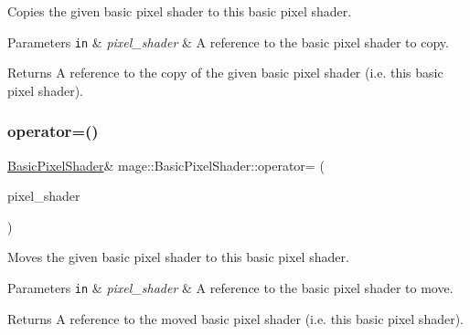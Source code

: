 Copies the given basic pixel shader to this basic pixel shader.


\begin{DoxyParams}[1]{Parameters}
\mbox{\tt in}  & {\em pixel\+\_\+shader} & A reference to the basic pixel shader to copy. \\
\hline
\end{DoxyParams}
\begin{DoxyReturn}{Returns}
A reference to the copy of the given basic pixel shader (i.\+e. this basic pixel shader). 
\end{DoxyReturn}
\hypertarget{classmage_1_1_basic_pixel_shader_a5d6224f0454d1d1f9583f6b9f8ad8201}{}\label{classmage_1_1_basic_pixel_shader_a5d6224f0454d1d1f9583f6b9f8ad8201} 
\subsubsection{\texorpdfstring{operator=()}{operator=()}\hspace{0.1cm}{\footnotesize\ttfamily [2/2]}}
{\footnotesize\ttfamily \hyperlink{classmage_1_1_basic_pixel_shader}{Basic\+Pixel\+Shader}\& mage\+::\+Basic\+Pixel\+Shader\+::operator= (\begin{DoxyParamCaption}\item[{\hyperlink{classmage_1_1_basic_pixel_shader}{Basic\+Pixel\+Shader} \&\&}]{pixel\+\_\+shader }\end{DoxyParamCaption})\hspace{0.3cm}{\ttfamily [delete]}}

Moves the given basic pixel shader to this basic pixel shader.


\begin{DoxyParams}[1]{Parameters}
\mbox{\tt in}  & {\em pixel\+\_\+shader} & A reference to the basic pixel shader to move. \\
\hline
\end{DoxyParams}
\begin{DoxyReturn}{Returns}
A reference to the moved basic pixel shader (i.\+e. this basic pixel shader). 
\end{DoxyReturn}
\hypertarget{classmage_1_1_basic_pixel_shader_a67ce881c6c02b2ceabca29cd3b6a4a89}{}\label{classmage_1_1_basic_pixel_shader_a67ce881c6c02b2ceabca29cd3b6a4a89} 
